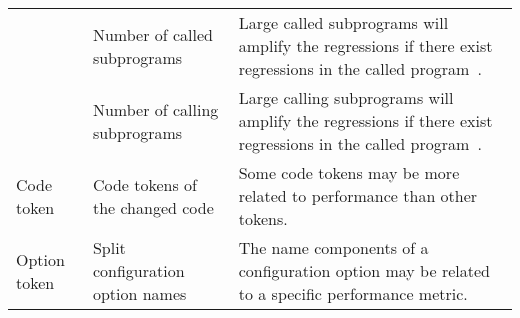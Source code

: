 \begin{table}[t]
\begin{tabular}{|p{1.3cm}|p{1.9cm}|p{4.9cm}|}
  \cline{2-3} 
  & Number of called subprograms & Large called subprograms will amplify the regressions if there exist regressions in the called program~\cite{Nagappan:2006:MMP}.\\
  \cline{2-3} 
  & Number of calling subprograms & Large calling subprograms will amplify the regressions if there exist regressions in the called program~\cite{Nagappan:2006:MMP}.\\ 
  \hline
Code token& Code tokens of the changed code & Some code tokens may be more related to performance than other tokens.\\ 
\hline
Option token & Split configuration option names & The name components of a configuration option may be related to a specific performance metric.\\ \hline
\end{tabular}
\label{tab:metrics}
\end{table}

